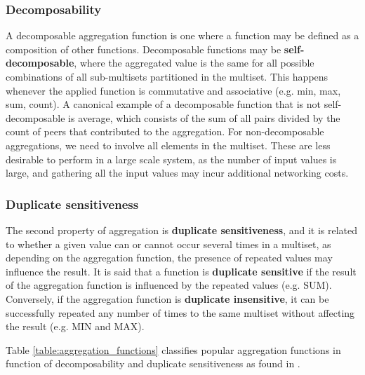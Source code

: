 \subsubsection*{Decomposability}

A decomposable aggregation function is one where a function may be defined as a composition of other functions. Decomposable functions may be \textbf{self-decomposable}, where the aggregated value is the same for all possible combinations of all sub-multisets partitioned in the multiset. This happens whenever the applied function is commutative and associative (e.g. min, max, sum, count). A canonical example of a decomposable function that is not self-decomposable is average, which consists of the sum of all pairs divided by the count of peers that contributed to the aggregation. For non-decomposable aggregations, we need to involve all elements in the multiset. These are less desirable to perform in a large scale system, as the number of input values is large, and gathering all the input values may incur additional networking costs.


\subsubsection*{Duplicate sensitiveness}

The second property of aggregation is \textbf{duplicate sensitiveness}, and it is related to whether a given value can or cannot occur several times in a multiset, as depending on the aggregation function, the presence of repeated values may influence the result. It is said that a function is \textbf{duplicate sensitive} if the result of the aggregation function is influenced by the repeated values (e.g. SUM). Conversely, if the aggregation function is \textbf{duplicate insensitive}, it can be successfully repeated any number of times to the same multiset without affecting the result (e.g. MIN and MAX).

Table \ref{table:aggregation_functions} classifies popular aggregation functions in function of decomposability and duplicate sensitiveness as found in \cite{DBLP:journals/corr/abs-1110-0725}.

